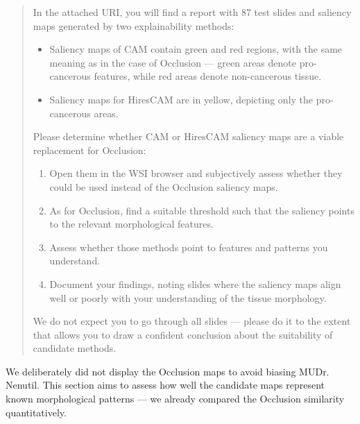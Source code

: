 \begin{doublebar}
\begin{quote}
In the attached URI, you will find a report with 87 test slides and saliency maps generated by two explainability methods:
\begin{itemize}
    \item Saliency maps of CAM contain green and red regions, with the same meaning as in the case of Occlusion --- green areas denote pro-cancerous features, while red areas denote non-cancerous tissue.
    \item Saliency maps for HiresCAM are in yellow, depicting only the pro-cancerous areas.
\end{itemize}
Please determine whether CAM or HiresCAM saliency maps are a viable replacement for Occlusion:
\begin{enumerate}
    \item Open them in the WSI browser and subjectively assess whether they could be used instead of the Occlusion saliency maps.
    \item As for Occlusion, find a suitable threshold such that the saliency points to the relevant morphological features.
    \item Assess whether those methods point to features and patterns you understand.
    \item Document your findings, noting slides where the saliency maps align well or poorly with your understanding of the tissue morphology.
\end{enumerate}
We do not expect you to go through all slides --- please do it to the extent that allows you to draw a confident conclusion about the suitability of candidate methods.
\end{quote}
\end{doublebar}
We deliberately did not display the Occlusion maps to avoid biasing MUDr. Nenutil.
This section aims to assess how well the candidate maps represent known morphological patterns --- we already compared the Occlusion similarity quantitatively.

